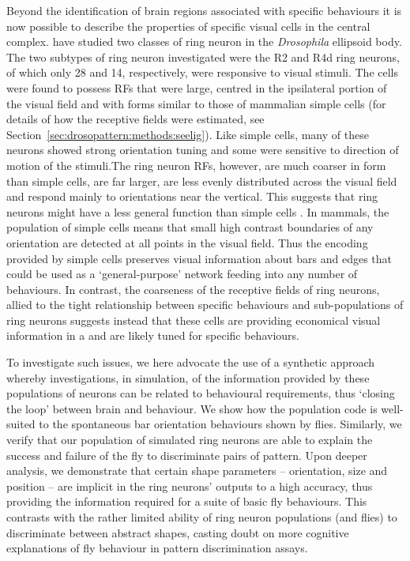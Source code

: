 Beyond the identification of brain regions associated with specific behaviours it is now possible to describe the properties of specific visual cells in the central complex.  have studied two classes of ring neuron in the \emph{Drosophila} ellipsoid body.
The two subtypes of ring neuron investigated were the R2 and R4d ring neurons, of which only 28 and 14, respectively, were responsive to visual stimuli.
The cells were found to possess \acp{RF} that were large, centred in the ipsilateral portion of the visual field and with forms similar to those of mammalian simple cells \cite{Hubel1962} (for details of how the receptive fields were estimated, see Section~\ref{sec:drosopattern:methods:seelig}).
Like simple cells, many of these neurons showed strong orientation tuning and some were sensitive to direction of motion of the stimuli.The ring neuron \acp{RF}, however, are much coarser in form than simple cells, are far larger, are less evenly distributed across the visual field and respond mainly to orientations near the vertical.
This suggests that ring neurons might have a less general function than simple cells \cite{Wystrach2014CB}.
In mammals, the population of simple cells means that small high contrast boundaries of any orientation are detected at all points in the visual field.
Thus the encoding provided by simple cells preserves visual information about bars and edges that could be used as a `general-purpose' network feeding into any number of behaviours.
In contrast, the coarseness of the receptive fields of ring neurons, allied to the tight relationship between specific behaviours and sub-populations of ring neurons suggests instead that these cells are providing economical visual information in a and are likely tuned for specific behaviours.

To investigate such issues, we here advocate the use of a synthetic approach whereby investigations, in simulation, of the information provided by these populations of neurons can be related to behavioural requirements, thus `closing the loop' between brain and behaviour. We show how the population code is well-suited to the spontaneous bar orientation behaviours shown by flies. Similarly, we verify that our population of simulated ring neurons are able to explain the success and failure of the fly to discriminate pairs of pattern.
Upon deeper analysis, we demonstrate that certain shape parameters -- orientation, size and position -- are implicit in the ring neurons' outputs to a high accuracy, thus providing the information required for a suite of basic fly behaviours.
This contrasts with the rather limited ability of ring neuron populations (and flies) to discriminate between abstract shapes, casting doubt on more cognitive explanations of fly behaviour in pattern discrimination assays.
